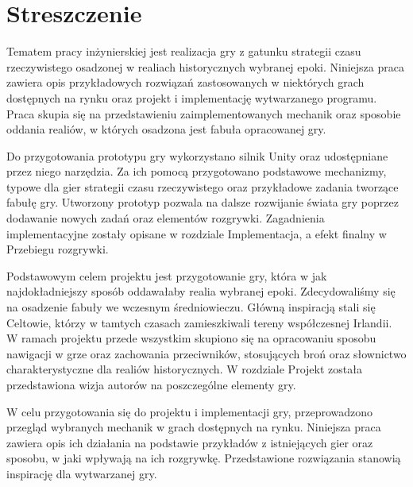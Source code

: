 \chapter*{Streszczenie}
Tematem pracy inżynierskiej jest realizacja gry z gatunku strategii czasu rzeczywistego osadzonej w realiach historycznych
wybranej epoki. Niniejsza praca zawiera opis przykładowych rozwiązań zastosowanych w niektórych grach dostępnych na rynku
oraz projekt i implementację wytwarzanego programu. Praca skupia się na przedstawieniu zaimplementowanych mechanik oraz
sposobie oddania realiów, w których osadzona jest fabuła opracowanej gry.

Do przygotowania prototypu gry wykorzystano silnik Unity oraz udostępniane przez niego narzędzia. Za ich pomocą
przygotowano podstawowe mechanizmy, typowe dla gier strategii czasu rzeczywistego oraz przykładowe zadania tworzące
fabułę gry. Utworzony prototyp pozwala na dalsze rozwijanie świata gry poprzez dodawanie nowych zadań oraz elementów
rozgrywki. Zagadnienia implementacyjne zostały opisane w rozdziale Implementacja, a efekt finalny w Przebiegu rozgrywki.

Podstawowym celem projektu jest przygotowanie gry, która w jak najdokładniejszy sposób oddawałaby realia wybranej epoki.
Zdecydowaliśmy się na osadzenie fabuły we wczesnym średniowieczu. Główną inspiracją stali się Celtowie, którzy w
tamtych czasach zamieszkiwali tereny współczesnej Irlandii. W ramach projektu przede wszystkim skupiono się na
opracowaniu sposobu nawigacji w grze oraz zachowania przeciwników, stosujących broń oraz słownictwo charakterystyczne
dla realiów historycznych. W rozdziale Projekt została przedstawiona wizja autorów na poszczególne elementy gry.

W celu przygotowania się do projektu i implementacji gry, przeprowadzono przegląd wybranych mechanik w grach dostępnych
na rynku. Niniejsza praca zawiera opis ich działania na podstawie przykładów z istniejących gier oraz sposobu, w jaki
wpływają na ich rozgrywkę. Przedstawione rozwiązania stanowią inspirację dla wytwarzanej gry.


